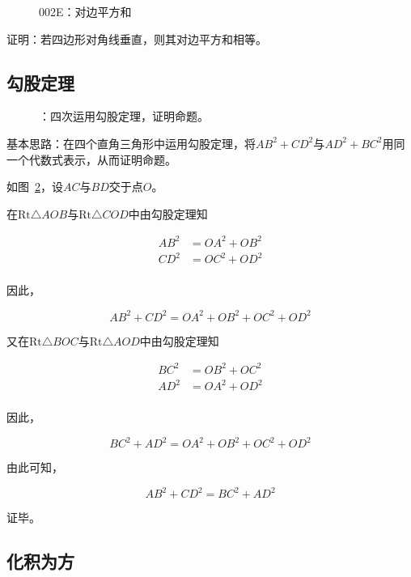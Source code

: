 

\begin{figure}[htbp]
  \centering
  \caption{002E：对边平方和} \label{fig:002E}
\end{figure}

证明：若四边形对角线垂直，则其对边平方和相等。

\subsection{勾股定理} \label{subsec:002E-pyth}

\begin{figure}[htbp]
  \centering
  \caption{：四次运用勾股定理，证明命题。}
  \label{fig:002E-pyth}
\end{figure}

基本思路：在四个直角三角形中运用勾股定理，将$AB^2 + CD^2$与$AD^2 + BC^2$用同一个代数式表示，从而证明命题。

如图~\ref{fig:002E-pyth}，设$AC$与$BD$交于点$O$。

在$\mathrm{Rt}\triangle AOB$与$\mathrm{Rt}\triangle COD$中由勾股定理知

\begin{align*}
  AB^2 &= OA^2 + OB^2 \\
  CD^2 &= OC^2 + OD^2 \\
\end{align*}

因此，

\[ AB^2 + CD^2 = OA^2 + OB^2 + OC^2 + OD^2 \]

又在$\mathrm{Rt}\triangle BOC$与$\mathrm{Rt}\triangle AOD$中由勾股定理知

\begin{align*}
  BC^2 &= OB^2 + OC^2 \\
  AD^2 &= OA^2 + OD^2 \\
\end{align*}

因此，

\[ BC^2 + AD^2 = OA^2 + OB^2 + OC^2 + OD^2 \]

由此可知，

\[ AB^2 + CD^2 = BC^2 + AD^2 \]

证毕。

\subsection{化积为方} \label{subsec:002E-squ}

